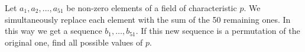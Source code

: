 Let \(a_1, a_2,\dots,a_{51}\) be non-zero elements of a field of characteristic \(p\). We simultaneously replace each element with the sum of the 50 remaining ones. In this way we get a sequence \(b_1, \dots , b_{51}\). If this new sequence is a permutation of the original one, find all possible values of \(p\).
